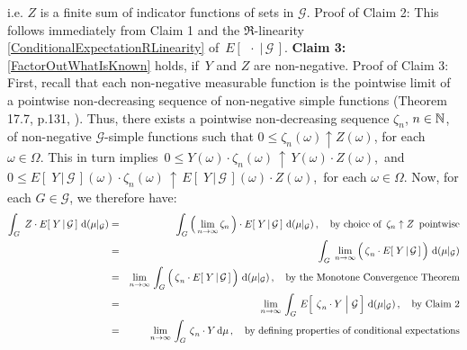 \begin{enumerate}
	i.e. $Z$ is a finite sum of indicator functions of sets in $\mathcal{G}$.
	\vskip 0.0cm
	Proof of Claim 2: This follows immediately from Claim 1 and
	the $\Re$-linearity \eqref{ConditionalExpectationRLinearity} of \,$E\!\left[\;\,\cdot\;\vert\,\mathcal{G}\,\right]$.
	\vskip 0.4cm
	\textbf{Claim 3:}\;\;\eqref{FactorOutWhatIsKnown} holds, if \,$Y$ and $Z$ are non-negative.
	\vskip 0.0cm
	Proof of Claim 3: First, recall that each non-negative measurable function is the pointwise limit
	of a pointwise non-decreasing sequence of non-negative simple functions (Theorem 17.7, p.131, \cite{Aliprantis1998}).
	Thus, there exists a pointwise non-decreasing sequence $\zeta_{n}$, $n \in \mathbb{N}$, of non-negative
	$\mathcal{G}$-simple functions such that $0 \leq \zeta_{n}(\omega) \uparrow Z(\omega)$, for each $\omega \in \Omega$.
	This in turn implies
	\,$0 \leq Y(\omega) \cdot \zeta_{n}(\omega) \,\uparrow\, Y(\omega) \cdot Z(\omega)$,\,
	and
	\,$0 \leq E\!\left[\;Y\,\vert\,\mathcal{G}\,\right](\omega) \cdot \zeta_{n}(\omega) \,\uparrow\, E\!\left[\;Y\,\vert\,\mathcal{G}\,\right](\omega) \cdot Z(\omega)$,\,
	for each $\omega \in \Omega$.
	Now, for each $G \in \mathcal{G}$, we therefore have:
	\begin{eqnarray*}
	\int_{G}\;Z \cdot E\!\left[\;Y\,\vert\,\mathcal{G}\,\right]\,\d(\mu\vert_{\mathcal{G}})
	&=&
		\int_{G}
			\left(\,\underset{n\rightarrow\infty}{\lim}\,\zeta_{n}\,\right)
			\cdot
			E\!\left[\;Y\,\vert\,\mathcal{G}\,\right]
			\,\d(\mu\vert_{\mathcal{G}})
			\,,\quad\textnormal{by choice of \,$\zeta_{n}\uparrow Z$\, pointwise}
	\\
	&=&
		\int_{G}\;
			\underset{n\rightarrow\infty}{\lim}\left(\,
				\overset{{\color{white}.}}{\zeta}_{n} \cdot E\!\left[\;Y\,\vert\,\mathcal{G}\,\right]
				\,\right)
			\,\d(\mu\vert_{\mathcal{G}})
	\\
	&=&
		\underset{n\rightarrow\infty}{\lim}\,
			\int_{G}\left(\,
				\overset{{\color{white}.}}{\zeta}_{n} \cdot E\!\left[\;Y\,\vert\,\mathcal{G}\,\right]
				\,\right)
			\,\d(\mu\vert_{\mathcal{G}})
			\,,\quad\textnormal{by the Monotone Convergence Theorem}
	\\
	&=&
		\underset{n\rightarrow\infty}{\lim}\,
			\int_{G}\,
				E\!\left[\;\left.\overset{{\color{white}.}}{\zeta}_{n} \cdot Y\;\right\vert\,\mathcal{G}\,\right]
			\,\d(\mu\vert_{\mathcal{G}})
			\,,\quad\textnormal{by Claim 2}
	\\
	&=&
		\underset{n\rightarrow\infty}{\lim}\,
			\int_{G}\,
				\overset{{\color{white}.}}{\zeta}_{n} \cdot Y
			\,\d\mu
			\,,\quad\textnormal{by defining properties of conditional expectations}

\end{eqnarray*}
\end{enumerate}
